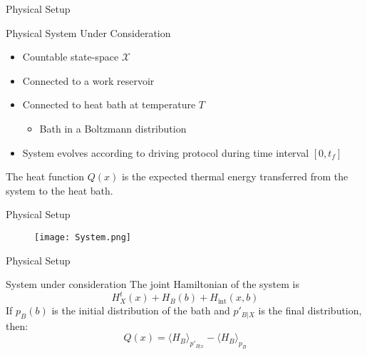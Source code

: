 \begin{frame}{Physical Setup}
\begin{block}{Physical System Under Consideration}
\begin{itemize}
	\item Countable state-space $\mathcal{X}$
	\item Connected to a work reservoir
	\item Connected to heat bath at temperature $T$
	\begin{itemize}
		\item Bath in a Boltzmann distribution
	\end{itemize}
	\item System evolves according to driving protocol during time interval $[0,t_f]$
\end{itemize}
The heat function $Q(x)$ is the expected thermal energy transferred from the system to the heat bath.
\end{block}
\end{frame}
\begin{frame}{Physical Setup}

    \begin{figure}
            \centering
            \texttt{[image: System.png]}
            \label{fig:system_visual}
        \end{figure}
\end{frame}

\begin{frame}{Physical Setup}
\begin{block}{System under consideration}
The joint Hamiltonian of the system is
\begin{equation*}
    H_X^t(x) + H_B(b) + H_{\text{int}}(x,b)
\end{equation*}
If $p_B(b)$ is the initial distribution of the bath and $p'_{B|X}$ is the final distribution, then:
\begin{equation*}
    Q(x) = \langle H_B \rangle_{p'_{B|x}} - \langle H_B \rangle_{p_B}
\end{equation*}
\end{block}
\end{frame}




